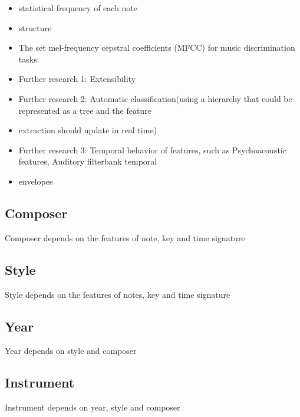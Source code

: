 \documentclass[a4paper,12pt]{article}
\begin{document}
\begin{itemize}
    \item statistical frequency of each note 
    \item structure 
    \item The set mel-frequency cepstral coefficients (MFCC) for music discrimination tasks.
    \item Further research 1: Extensibility
    \item Further research 2: Automatic classification(using a hierarchy that could be represented as a tree and the feature
    \item extraction should update in real time)
    \item Further research 3: Temporal behavior of features, such as Psychoacoustic features, Auditory filterbank temporal       
    \item envelopes
\end{itemize}

\subsection{Composer}

Composer depends on the features of note, key and time signature

\subsection{Style}

Style depends on the features of notes, key and time signature

\subsection{Year}

Year depends on style and composer

\subsection{Instrument}

Instrument depends on year, style and composer


\end{document}

